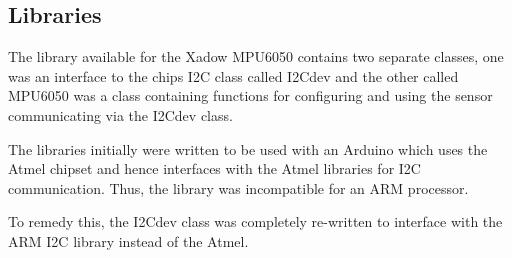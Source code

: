 
\subsection{Libraries}

The library available for the Xadow MPU6050 contains two separate classes, one was an interface to the chips I2C class called I2Cdev and the other called MPU6050 was a class containing functions for configuring and using the sensor communicating via the I2Cdev class. 

The libraries initially were written to be used with an Arduino which uses the Atmel chipset and hence interfaces with the Atmel libraries for I2C communication. Thus, the library was incompatible for an ARM processor. 

To remedy this, the I2Cdev class was completely re-written to interface with the ARM I2C library instead of the Atmel. 


